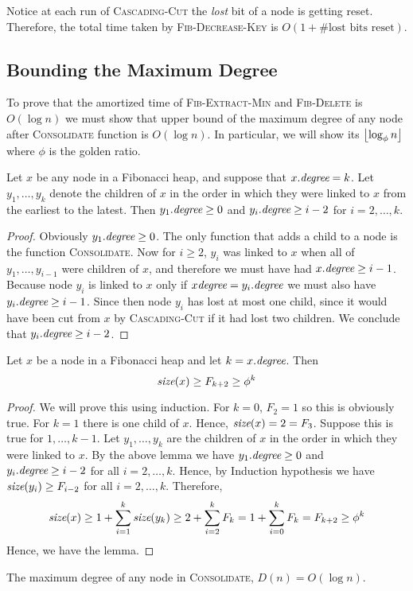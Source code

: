 Notice at each run of \textsc{Cascading-Cut} the \emph{lost} bit of a node is getting reset. Therefore, the total time taken by \textsc{Fib-Decrease-Key} is $O(1+\#\text{lost bits reset})$. 
\subsection{Bounding the Maximum Degree}\label{max-degree-bound}
To prove that the amortized time of \textsc{Fib-Extract-Min} and \textsc{Fib-Delete} is $O(\log n)$ we must show that upper bound of the maximum degree of any node after \textsc{Consolidate} function is $O(\log n)$. In particular, we will show its $\left\lfloor \log_{\phi}n\right\rfloor$ where $\phi$ is the golden ratio.
\begin{lemma}{}{}
Let $x$ be any node in a Fibonacci heap, and suppose that $x.\emph{degree}=k$. Let $y_1,\dots, y_k$ denote the children of $x$ in the order in which they were linked to $x$ from the earliest to the latest. Then $y_1.\emph{degree}\geq 0$ and $y_i.\emph{degree}\geq i-2$ for $i=2,\dots, k$.
\end{lemma}
\begin{proof}
	Obviously $y_1.\emph{degree}\geq 0$. The only function that adds a child to a node is the function \textsc{Consolidate}. Now for $i\geq 2$, $y_i$ was linked to $x$ when all of $y_1,\dots, y_{i-1}$ were children of $x$, and therefore we must have had $x.\emph{degree}\geq i-1$. Because node $y_i$ is linked to $x$ only if $x\emph{degree}=y_i.\emph{degree}$ we must also have $y_i.\emph{degree}\geq i-1$. Since then node $y_i$ has lost at most one child, since it would have been cut from $x$ by \textsc{Cascading-Cut} if it had lost two children. We conclude that $y_i.\emph{degree}\geq i-2$. 
\end{proof}
\begin{lemma}{}{}
Let $x$ be a node in a Fibonacci heap and let $k=x.\emph{degree}$. Then $$\emph{size}(x)\geq F_{k+2}\geq \phi^k$$
\end{lemma}
\begin{proof}
We will prove this using induction. For $k=0$, $F_2=1$ so this is obviously true. For $k=1$ there is one child of $x$. Hence, $\emph{size}(x)=2=F_3$. Suppose this is true for $1,\dots, k-1$. Let $y_1,\dots, y_k$ are the children of $x$  in the order in which they were linked to $x$. By the above lemma we have $y_1.\emph{degree}\geq 0$ and $y_i.\emph{degree}\geq i-2$ for all $i=2,\dots, k$. Hence, by Induction hypothesis we have $\emph{size}(y_i)\geq F_{i-2}$ for all $i=2,\dots, k$. Therefore, \[
	\emph{size}(x) \geq 1+\sum\limits_{i=1}^{k}\emph{size}(y_k)\geq 2+\sum\limits_{i=2}^kF_{k}=1+\sum\limits_{i=0}^k F_k=F_{k+2}\geq \phi^k
\]Hence, we have the lemma.
\end{proof}
\begin{corollary}{}{}
	The maximum degree of any node in \textsc{Consolidate}, $D(n)=O(\log n)$.
\end{corollary}
